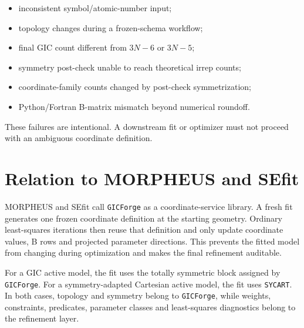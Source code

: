 \documentclass[11pt]{article}
\newcommand{\program}{\texttt{GICForge}}
\begin{document}
\begin{itemize}
  \item inconsistent symbol/atomic-number input;
  \item topology changes during a frozen-schema workflow;
  \item final GIC count different from \(3N-6\) or \(3N-5\);
  \item symmetry post-check unable to reach theoretical irrep counts;
  \item coordinate-family counts changed by post-check symmetrization;
  \item Python/Fortran B-matrix mismatch beyond numerical roundoff.
\end{itemize}

\noindent
These failures are intentional.  A downstream fit or optimizer must not proceed
with an ambiguous coordinate definition.

\section{Relation to MORPHEUS and SEfit}

MORPHEUS and SEfit call \program{} as a coordinate-service library.  A fresh fit
generates one frozen coordinate definition at the starting geometry.  Ordinary
least-squares iterations then reuse that definition and only update coordinate
values, B rows and projected parameter directions.  This prevents the fitted
model from changing during optimization and makes the final refinement
auditable.

For a GIC active model, the fit uses the totally symmetric block assigned by
\program{}.  For a symmetry-adapted Cartesian active model, the fit uses
\texttt{SYCART}.  In both cases, topology and symmetry belong to
\program{}, while weights, constraints, predicates, parameter classes and
least-squares diagnostics belong to the refinement layer.
\end{document}
